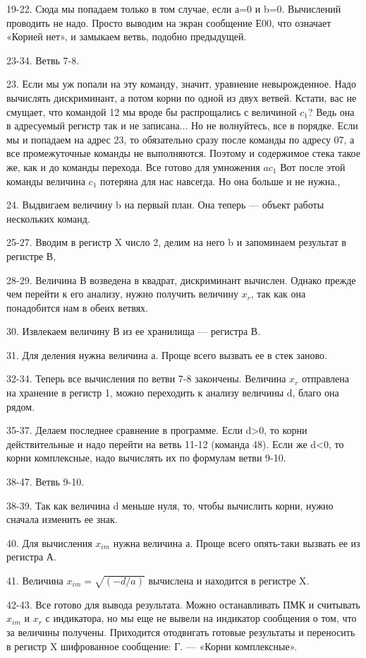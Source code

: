 \documentclass[11pt,a4paper,oneside]{article}
\begin{document}
19-22. Сюда мы попадаем только в том случае, если а=0 и b=0. Вычислений проводить не надо. Просто выводим на экран сообщение Е00, что означает «Корней нет», и замыкаем ветвь, подобно предыдущей.

23-34. Ветвь 7-8.

23. 	Если мы уж попали на эту команду, значит, уравнение невырожденное. Надо вычислять дискриминант, а потом корни по одной из двух ветвей. Кстати, вас не смущает, что командой 12 мы вроде бы распрощались с величиной $c_{1}$? Ведь она в адресуемый регистр так и не записана... Но не волнуйтесь, все в порядке. Если мы и попадаем на адрес 23, то обязательно сразу после команды по адресу 07, а все промежуточные команды не выполняются. Поэтому и содержимое стека такое же, как и до команды перехода. Все готово для умножения $ac_{1}$ Вот после этой команды величина $c_{1}$ потеряна для нас навсегда. Но она больше и не нужна.,

24. 	Выдвигаем величину b на первый план. Она теперь — объект работы нескольких команд.

25-27. Вводим в регистр X число 2, делим на него b и запоминаем результат в регистре В,

28-29.	Величина В возведена в квадрат, дискриминант вычислен. Однако прежде чем перейти к его анализу,	нужно получить величину $x_{r}$, так как она понадобится нам в обеих ветвях.

30. 	Извлекаем величину В из ее хранилища — регистра В.

31. 	Для деления нужна величина а. Проще всего вызвать ее в стек заново.

32-34. Теперь все вычисления по ветви 7-8 закончены. Величина $x_{r}$ отправлена на хранение в регистр 1, можно переходить к анализу величины d, благо она рядом.

35-37. Делаем последнее сравнение в программе. Если d>0, то корни действительные и надо перейти на ветвь 11-12 (команда 48). Если же d<0, то корни комплексные, надо вычислять их по формулам ветви 9-10.

38-47. Ветвь 9-10.

38-39. Так как величина d меньше нуля, то, чтобы вычислить корни, нужно сначала изменить ее знак.

40. 	Для вычисления $x_{im}$ нужна величина а. Проще всего опять-таки вызвать ее из регистра А.

41. 	Величина $x_{im} = \sqrt{(-d/a)}$ вычислена и находится в регистре X.

42-43. Все готово для вывода результата. Можно останавливать ПМК и считывать $x_{im}$ и $x_{r}$ с индикатора, но мы еще не вывели на индикатор сообщения о том, что за величины получены. Приходится отодвигать готовые результаты и переносить в регистр X шифрованное сообщение: Г. — «Корни комплексные».
\end{document}

